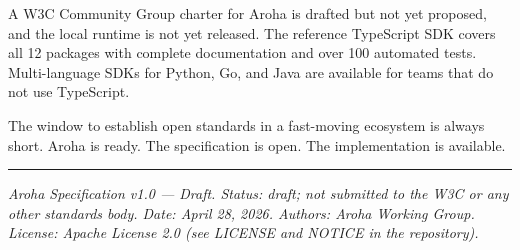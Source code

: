 \documentclass[11pt,a4paper]{article}
\begin{document}
A W3C Community Group charter for Aroha is drafted but not yet proposed, and the
local runtime is not yet released. The reference TypeScript SDK covers all 12 packages
with complete documentation and over 100 automated tests. Multi-language SDKs
for Python, Go, and Java are available for teams that do not use TypeScript.

The window to establish open standards in a fast-moving ecosystem is always
short. Aroha is ready. The specification is open. The implementation is available.

\vspace{1.2cm}
\hrule
\vspace{0.5cm}
\noindent\small\textit{%
  Aroha Specification v1.0 --- Draft.
  Status: draft; not submitted to the W3C or any other standards body.
  Date: April 28, 2026.
  Authors: Aroha Working Group.
  License: Apache License 2.0 (see LICENSE and NOTICE in the repository).%
}
\end{document}
